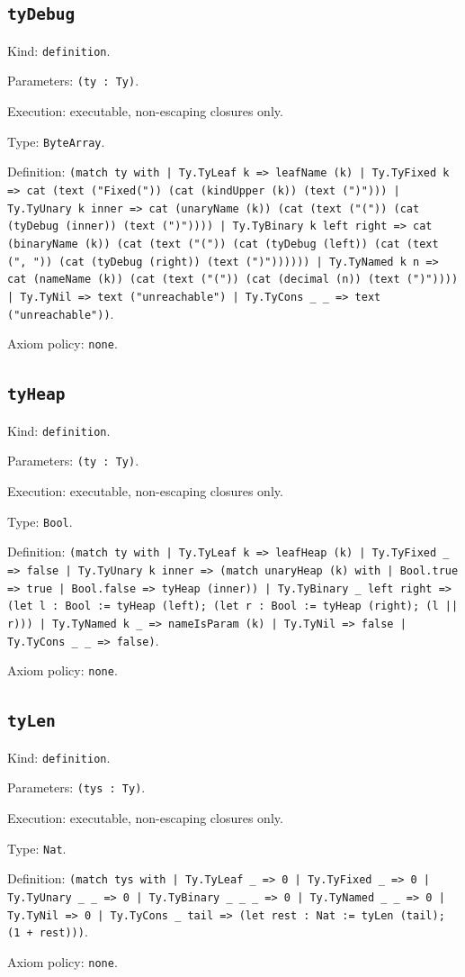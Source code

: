 \documentclass[11pt]{article}
\begin{document}
\subsection*{\texttt{tyDebug}}
\noindent Kind: \texttt{definition}.\par
\noindent Parameters: \texttt{(ty : Ty)}.\par
\noindent Execution: executable, non-escaping closures only.\par
\noindent Type: \texttt{ByteArray}.\par
\noindent Definition: \texttt{(match ty with | Ty.TyLeaf k => leafName (k) | Ty.TyFixed k => cat (text ("Fixed(")) (cat (kindUpper (k)) (text (")"))) | Ty.TyUnary k inner => cat (unaryName (k)) (cat (text ("(")) (cat (tyDebug (inner)) (text (")")))) | Ty.TyBinary k left right => cat (binaryName (k)) (cat (text ("(")) (cat (tyDebug (left)) (cat (text (", ")) (cat (tyDebug (right)) (text (")")))))) | Ty.TyNamed k n => cat (nameName (k)) (cat (text ("(")) (cat (decimal (n)) (text (")")))) | Ty.TyNil => text ("unreachable") | Ty.TyCons \_ \_ => text ("unreachable"))}.\par
\noindent Axiom policy: \texttt{none}.\par
\subsection*{\texttt{tyHeap}}
\noindent Kind: \texttt{definition}.\par
\noindent Parameters: \texttt{(ty : Ty)}.\par
\noindent Execution: executable, non-escaping closures only.\par
\noindent Type: \texttt{Bool}.\par
\noindent Definition: \texttt{(match ty with | Ty.TyLeaf k => leafHeap (k) | Ty.TyFixed \_ => false | Ty.TyUnary k inner => (match unaryHeap (k) with | Bool.true => true | Bool.false => tyHeap (inner)) | Ty.TyBinary \_ left right => (let l : Bool := tyHeap (left); (let r : Bool := tyHeap (right); (l || r))) | Ty.TyNamed k \_ => nameIsParam (k) | Ty.TyNil => false | Ty.TyCons \_ \_ => false)}.\par
\noindent Axiom policy: \texttt{none}.\par
\subsection*{\texttt{tyLen}}
\noindent Kind: \texttt{definition}.\par
\noindent Parameters: \texttt{(tys : Ty)}.\par
\noindent Execution: executable, non-escaping closures only.\par
\noindent Type: \texttt{Nat}.\par
\noindent Definition: \texttt{(match tys with | Ty.TyLeaf \_ => 0 | Ty.TyFixed \_ => 0 | Ty.TyUnary \_ \_ => 0 | Ty.TyBinary \_ \_ \_ => 0 | Ty.TyNamed \_ \_ => 0 | Ty.TyNil => 0 | Ty.TyCons \_ tail => (let rest : Nat := tyLen (tail); (1 + rest)))}.\par
\noindent Axiom policy: \texttt{none}.\par
\end{document}
